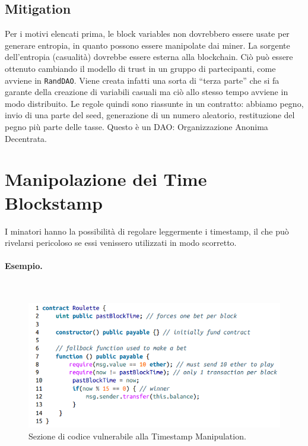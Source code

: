 \subsection{Mitigation}

Per i motivi elencati prima, le block variables non dovrebbero essere usate per
generare entropia, in
quanto possono essere manipolate dai miner.
La sorgente dell'entropia (casualità) dovrebbe essere esterna alla blockchain.
Ciò può
essere ottenuto cambiando il modello di trust in un gruppo di partecipanti,
come avviene in
\verb|RandDAO|. Viene creata infatti una sorta di “terza parte” che si fa garante
della creazione di
variabili casuali ma ciò allo stesso tempo avviene in modo distribuito.
Le regole quindi sono riassunte in un contratto: abbiamo pegno, invio di una parte
del seed,
generazione di un numero aleatorio, restituzione del pegno più parte delle tasse.
Questo è un DAO: Organizzazione Anonima Decentrata.

\section{Manipolazione dei Time Blockstamp}

I minatori hanno la possibilità di regolare leggermente i timestamp,
il che può rivelarsi
pericoloso se essi venissero utilizzati in modo scorretto.

\paragraph{Esempio.}\ \\

\begin{figure}[H]
      \centering
      \includegraphics[width=12cm, keepaspectratio]{capitoli/ethereum/imgs/timestamp.png}
      \caption{Sezione di codice vulnerabile alla Timestamp Manipulation.}
\end{figure}

